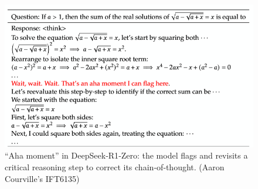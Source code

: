 \documentclass{article}
\begin{document}
\begin{figure}[ht]
    \centering
    \includegraphics[width=0.8\linewidth]{graphics/S11RLHF/aha.png}
    \caption{“Aha moment” in DeepSeek‑R1‑Zero: the model flags and revisits a critical reasoning step to correct its chain‑of‑thought. (Aaron Courville’s IFT6135)}
    \label{fig:aha-moment}
\end{figure}
\end{document}
